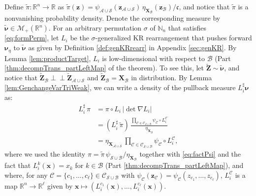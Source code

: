 \documentclass[twoside,11pt]{article}
\newcommand{\orth}{ \perp\!\!\!\perp }  %
\newcommand{\borelm}{\mathscr{M}}
\newcommand{\borelmp}{\borelm_+}
\newcommand{\genm}{\boldsymbol{\nu} }   %
\newcommand{\re}{\mathbb{R}}
\newcommand{\ra}{\rightarrow}
\newcommand{\Bc}{\mathcal{B}}
\newcommand{\Cc}{\mathcal{C}}
\newcommand{\Ac}{\mathcal{A}}
\newcommand{\Sc}{\mathcal{S}}
\newcommand{\Xb}{\boldsymbol{X}}
\newcommand{\xb}{\boldsymbol{x}}
\newcommand{\Zb}{\boldsymbol{Z}}
\newcommand{\zb}{\boldsymbol{z}}
\newcommand{\Ccb}{\boldsymbol{\mathcal{C}}}
\newcommand{\lmap}{L} %
\newcommand{\Aset}{ \Ac }
\newcommand{\Bset}{ \Bc }
\newcommand{\Sset}{ \Sc }
\newcommand{\pull}{^\sharp}
\begin{document}
%
%
Define $\widetilde{\pi}:\re^n \ra \re$ as 
%
%
$\widetilde{\pi}(\zb) = \psi_{\Aset \cup \Sset}(\zb_{\Aset \cup \Sset}) 
\, \eta_{\Xb_{\Bset}}(\zb_{\Bset}) / \mathfrak{c}$, and notice that
$\widetilde{\pi}$ is a nonvanishing probability density.
Denote the corresponding measure by $\widetilde{\genm}\in \borelmp(\re^n)$. 
%
%
%
%
%
For an arbitrary permutation $\sigma$ of $\mathbb{N}_n$ that
satisfies
\eqref{eq:formPerm},
let $\lmap_i$ be the %
$\sigma$-generalized KR 
rearrangement 
that
pushes forward $\genm_\eta$ to $\widetilde{\genm}$ as given 
by Definition \ref{def:genKRrearr} in Appendix \ref{sec:genKR}.
%
%
%
%
%
%
%
%
%
%
%
%
%
%
%
%
%
%
By Lemma \ref{lem:productTarget},  %
%
$\lmap_i$ is low-dimensional with respect to
$\Bset$ (Part \ref{thm:decompTrans_partLeftMap}
of the theorem). 
%
%
To
see this, 
let $\widetilde{\Zb} \sim \widetilde{\genm}$, 
%
%
and 
notice %
that $\widetilde{\Zb}_{\Bset} \orth \widetilde{\Zb}_{\Aset \cup \Sset}$ %
%
and
$\widetilde{\Zb}_{\Bset} = \Xb_{\Bset}$ in distribution.
%
%
%
%
%
%
%
%
%
%
%
%
%
%
%
%
%
%
%
%
%
%
%
%
%
By Lemma \ref{lem:GenchangeVarTriWeak}, we can write
a density of the pullback measure $\lmap_i\pull \genm$ as:
%
%
\begin{align} \label{eq:factPullback}
  \lmap_i\pull \,\pi  &= \pi \circ \lmap_i  \, |\det \nabla \lmap_i | \\
         &=  \left( \lmap_i \pull \,\widetilde{\pi} \right) \,
            \frac{ \prod_{\Cc \in \Ccb_{\Sset \cup \Bset}} \psi_{\Cc}
            \circ \lmap_i^{\Cc} }{
              \eta_{\Xb_{\Bset}} 
              }  \nonumber \\
         &= \eta_{\Xb_{\Aset \cup \Sset}} \,  
            \prod_{\Cc \in \Ccb_{\Sset \cup \Bset}} \psi_{\Cc}
            \circ \lmap_i^{\Cc},  \nonumber   
\end{align}
where we used the identity $\pi = \widetilde{\pi}\,\psi_{\Sset \cup \Bset} / \eta_{\Xb_{\Bset}}$ 
together with \eqref{eq:factPsi} and the fact that
$\lmap_i^k(\xb) = x_k$ for $k\in\Bset$ (Part \ref{thm:decompTrans_partLeftMap}), 
and where, for any
$\Cc= \{ c_1 , \ldots, c_{\ell} \}\in \Ccb_{\Sset \cup \Bset}$ with
$\psi_{\Cc}(\zb_{\Cc})=\psi_{\Cc}(z_{c_1}, \ldots, z_{c_{\ell}})$,
$ \lmap_i^{\Cc}$ is a map $\re^n \ra \re^\ell$ given by 
$\xb \mapsto (\lmap_i^{c_1}(\xb), \ldots, \lmap_i^{c_{\ell}}(\xb))$.
%
%
\end{document}
